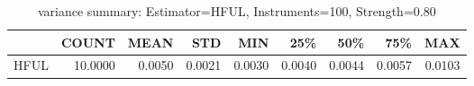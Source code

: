 \begin{table}[ht]
\centering
\caption{variance summary: Estimator=HFUL, Instruments=100, Strength=0.80}
\begin{tabular}{lrrrrrrrr}
\toprule
 & COUNT & MEAN & STD & MIN & 25\% & 50\% & 75\% & MAX \\
\midrule
HFUL & 10.0000 & 0.0050 & 0.0021 & 0.0030 & 0.0040 & 0.0044 & 0.0057 & 0.0103 \\
\bottomrule
\end{tabular}
\end{table}
